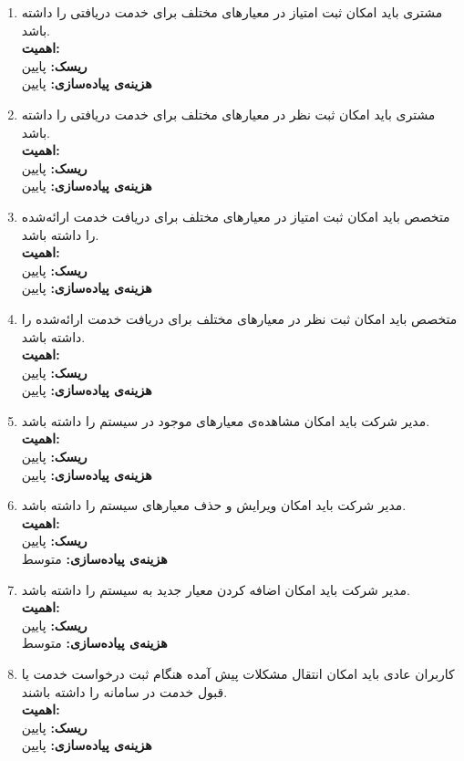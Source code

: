 \begin{enumerate}
	\item
مشتری باید امکان ثبت امتیاز در معیارهای مختلف برای خدمت دریافتی را داشته باشد.
\\
\textbf{اهمیت:} 
\\
\textbf{ریسک:} پایین
\\
\textbf{هزینه‌ی پیاده‌سازی:} پایین
	\item
مشتری باید امکان ثبت نظر در معیارهای مختلف برای خدمت دریافتی را داشته باشد.
\\
\textbf{اهمیت:} 
\\
\textbf{ریسک:} پایین
\\
\textbf{هزینه‌ی پیاده‌سازی:} پایین
	\item
متخصص باید امکان ثبت امتیاز در معیارهای مختلف برای دریافت خدمت ارائه‌شده را داشته باشد.
\\
\textbf{اهمیت:} 
\\
\textbf{ریسک:} پایین
\\
\textbf{هزینه‌ی پیاده‌سازی:} پایین
	\item
متخصص باید امکان ثبت نظر در معیارهای مختلف برای دریافت خدمت ارائه‌شده را داشته باشد.
\\
\textbf{اهمیت:} 
\\
\textbf{ریسک:} پایین
\\
\textbf{هزینه‌ی پیاده‌سازی:} پایین
	\item
مدیر شرکت باید امکان مشاهده‌ی معیارهای موجود در سیستم را داشته باشد.
\\
\textbf{اهمیت:} 
\\
\textbf{ریسک:} پایین
\\
\textbf{هزینه‌ی پیاده‌سازی:} پایین
	\item
مدیر شرکت باید امکان ویرایش و حذف معیارهای سیستم را داشته باشد.
\\
\textbf{اهمیت:} 
\\
\textbf{ریسک:} پایین
\\
\textbf{هزینه‌ی پیاده‌سازی:} متوسط

	\item
مدیر شرکت باید امکان اضافه کردن معیار جدید به سیستم را داشته باشد.
\\
\textbf{اهمیت:} 
\\
\textbf{ریسک:} پایین
\\
\textbf{هزینه‌ی پیاده‌سازی:} متوسط


	\item
کاربران عادی باید امکان انتقال مشکلات پیش آمده هنگام ثبت درخواست خدمت یا قبول خدمت در سامانه را داشته باشند.
\\
\textbf{اهمیت:} 
\\
\textbf{ریسک:} پایین
\\
\textbf{هزینه‌ی پیاده‌سازی:} پایین

\end{enumerate}

